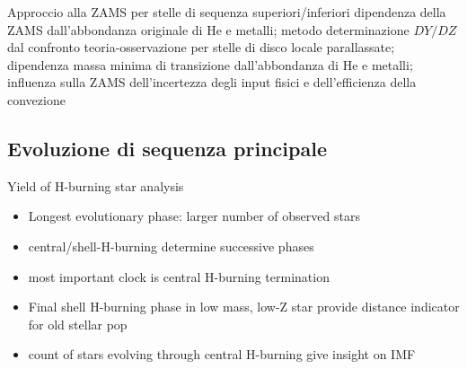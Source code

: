 \begin{frame}{Approccio alla ZAMS per stelle di sequenza superiori/inferiori}
dipendenza della ZAMS dall'abbondanza originale di He e metalli; metodo determinazione $DY/DZ$ dal confronto teoria-osservazione per stelle di disco locale parallassate; dipendenza massa minima di transizione dall'abbondanza di He e metalli; influenza sulla ZAMS dell'incertezza degli input fisici e dell'efficienza della convezione
\end{frame}

\subsection{Evoluzione di sequenza principale}

\begin{frame}{Yield of H-burning star analysis}
\begin{itemize}
\item Longest evolutionary phase: larger number of observed stars
\item central/shell-H-burning determine successive phases
\item most important clock is central H-burning termination
\item Final shell H-burning phase in low mass, low-Z star provide distance indicator for old stellar pop
\item count of stars evolving through central H-burning give insight on IMF
\end{itemize}
\end{frame}

